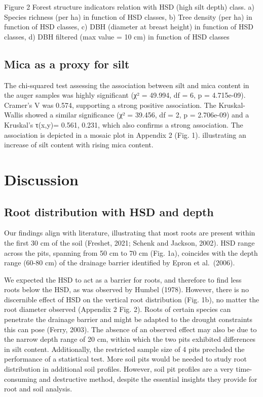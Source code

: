 \documentclass[fleqn,10pt]{latex/stylish_article} %
\begin{document}
\normalsize
Figure 2 Forest structure indicators relation with HSD (high silt depth) class. a) Species richness (per ha) in function of HSD classes, b) Tree density (per ha) in function of HSD classes, c) DBH (diameter at breast height) in function of HSD classes, d) DBH filtered (max value = 10 cm) in function of HSD classes

\hypertarget{mica-as-a-proxy-for-silt}{%
\subsection{Mica as a proxy for silt}\label{mica-as-a-proxy-for-silt}}

The chi-squared test assessing the association between silt and mica content in the auger samples was highly significant (χ² = 49.994, df = 6, p = 4.715e-09). Cramer's V was 0.574, supporting a strong positive association. The Kruskal-Wallis showed a similar significance (χ² = 39.456, df = 2, p = 2.706e-09) and a Kruskal's τ(x,y)= 0.561, 0.231, which also confirms a strong association. The association is depicted in a mosaic plot in Appendix 2 (Fig. 1). illustrating an increase of silt content with rising mica content.

\hypertarget{discussion}{%
\section{Discussion}\label{discussion}}

\hypertarget{root-distribution-with-hsd-and-depth}{%
\subsection{Root distribution with HSD and depth}\label{root-distribution-with-hsd-and-depth}}

Our findings align with literature, illustrating that most roots are present within the first 30 cm of the soil (Freshet, 2021; Schenk and Jackson, 2002). HSD range across the pits, spanning from 50 cm to 70 cm (Fig. 1a), coincides with the depth range (60-80 cm) of the drainage barrier identified by Epron et al.~(2006).

We expected the HSD to act as a barrier for roots, and therefore to find less roots below the HSD, as was observed by Humbel (1978). However, there is no discernible effect of HSD on the vertical root distribution (Fig. 1b), no matter the root diameter observed (Appendix 2 Fig. 2). Roots of certain species can penetrate the drainage barrier and might be adapted to the drought constraints this can pose (Ferry, 2003). The absence of an observed effect may also be due to the narrow depth range of 20 cm, within which the two pits exhibited differences in silt content. Additionally, the restricted sample size of 4 pits precluded the performance of a statistical test. More soil pits would be needed to study root distribution in additional soil profiles. However, soil pit profiles are a very time-consuming and destructive method, despite the essential insights they provide for root and soil analysis.
\end{document}
